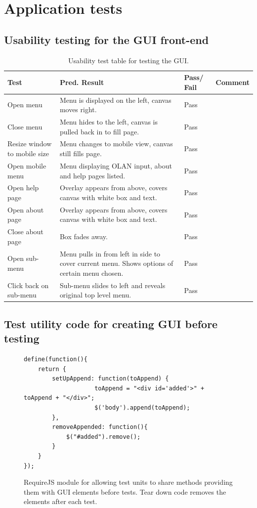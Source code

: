 \chapter{Application tests}

\section{Usability testing for the GUI front-end}
\label{test:canvas}
\begin{table}[h]
\begin{tabular}{|p{4.5cm}|p{4.5cm}|p{2cm}|p{2.5cm}|}
\hline
\textbf{Test} & \textbf{Pred. Result} & \textbf{Pass/ Fail} & \textbf{Comment}                        \\ \hline
Open menu    &   Menu is displayed on the left, canvas moves right. &  Pass          &    \\ \hline
Close menu    &   Menu hides to the left, canvas is pulled back in to fill page. &   Pass         &     \\ \hline
Resize window to mobile size    & Menu changes to mobile view, canvas still fills page.   & Pass           &     \\ \hline
Open mobile menu    & Menu displaying OLAN input, about and help pages listed.   &     Pass       &     \\ \hline
Open help page    &  Overlay appears from above, covers canvas with white box and text.  &       Pass     &     \\ \hline
Open about page    &  Overlay appears from above, covers canvas with white box and text.  &      Pass      &     \\ \hline
Close about page    &  Box fades away.  &      Pass      &     \\ \hline
Open sub-menu    &  Menu pulls in from left in side to cover current menu. Shows options of certain menu chosen.  &    Pass        &     \\ \hline
Click back on sub-menu    &  Sub-menu slides to left and reveals original top level menu.  &    Pass        &     \\ \hline
\end{tabular}
\caption{Usability test table for testing the GUI.}
\end{table}

\clearpage

\section{Test utility code for creating GUI before testing}
\label{test:utils}
\begin{figure}[h!]
\caption{RequireJS module for allowing test units to share methods providing them with GUI elements before tests. Tear down code removes the elements after each test.}
\begin{lstlisting}
define(function(){ 
	return {
		setUpAppend: function(toAppend) {
		            toAppend = "<div id='added'>" + toAppend + "</div>";
		            $('body').append(toAppend);
		},
        removeAppended: function(){
            $("#added").remove();
        }
	}
});
\end{lstlisting}
\end{figure}

